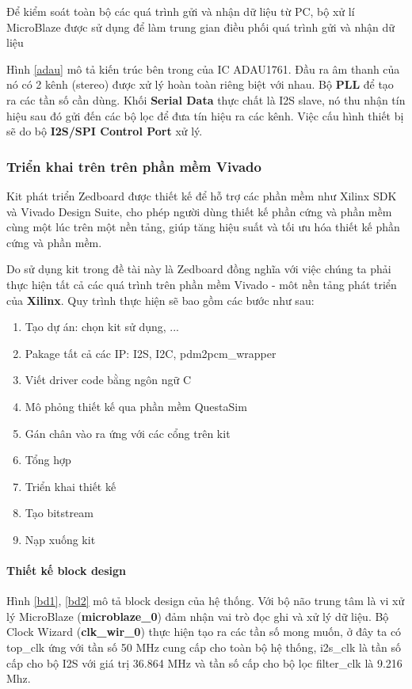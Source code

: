 Để kiểm soát toàn bộ các quá trình gửi và nhận dữ liệu từ PC, bộ xử lí MicroBlaze được sử dụng để làm trung gian điều phối quá trình gửi và nhận dữ liệu

Hình \ref{adau} mô tả kiến trúc bên trong của IC ADAU1761. Đầu ra âm thanh của nó có 2 kênh (stereo) được xử lý hoàn toàn riêng biệt với nhau. Bộ \textbf{PLL} để tạo ra các tần số cần dùng. Khối \textbf{Serial Data} thực chất là I2S slave, nó thu nhận tín hiệu sau đó gửi đến các bộ lọc để đưa tín hiệu ra các kênh. Việc cấu hình thiết bị sẽ do bộ \textbf{I2S/SPI Control Port} xử lý.

\subsubsection{Triển khai trên trên phần mềm Vivado}

Kit phát triển Zedboard được thiết kế để hỗ trợ các phần mềm như Xilinx SDK và Vivado Design Suite, cho phép người dùng thiết kế phần cứng và phần mềm cùng một lúc trên một nền tảng,  giúp tăng hiệu suất và tối ưu hóa thiết kế phần cứng và phần mềm.

Do sử dụng kit trong đề tài này là Zedboard đồng nghĩa với việc chúng ta phải thực hiện tất cả các quá trình trên phần mềm Vivado - môt nền tảng phát triển của \textbf{Xilinx}.
Quy trình thực hiện sẽ bao gồm các bước như sau:
\begin{enumerate}
    \item Tạo dự án: chọn kit sử dụng, ...
    \item Pakage tất cả các IP: I2S, I2C, pdm2pcm\_wrapper
    \item Viết driver code bằng ngôn ngữ C
    \item Mô phỏng thiết kế qua phần mềm QuestaSim
    \item Gán chân vào ra ứng với các cổng trên kit
    \item Tổng hợp
    \item Triển khai thiết kế
    \item Tạo bitstream
    \item Nạp xuống kit
\end{enumerate}



\paragraph{Thiết kế block design}
Hình \ref{bd1}, \ref{bd2} mô tả block design của hệ thống. Với bộ não trung tâm là vi xử lý MicroBlaze (\textbf{microblaze\_0}) đảm nhận vai trò đọc ghi và xử lý dữ liệu. Bộ Clock Wizard (\textbf{clk\_wir\_0}) thực hiện tạo ra các tần số mong muốn, ở đây ta có top\_clk ứng với tần số 50 MHz cung cấp cho toàn bộ hệ thống, i2s\_clk là tần số cấp cho bộ I2S với giá trị 36.864 MHz và tần số cấp cho bộ lọc filter\_clk là 9.216 Mhz.

